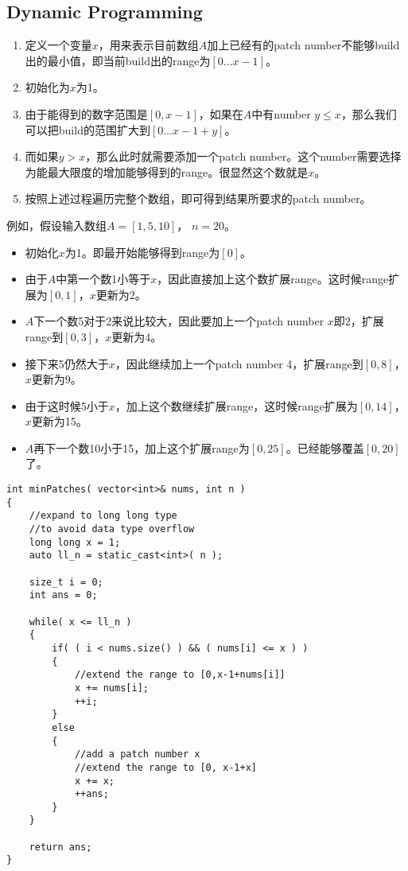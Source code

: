 \subsection{Dynamic Programming}
\begin{enumerate}
\item 定义一个变量$ x $，用来表示目前数组$A$加上已经有的patch number不能够build出的最小值，即当前build出的range为$[0\ldots x-1]$。
\item 初始化为$x$为1。
\item 由于能得到的数字范围是$[0, x-1]$，如果在$A$中有number $y\leq x$，那么我们可以把build的范围扩大到$[0\ldots x-1+y]$。
\item 而如果$y>x$，那么此时就需要添加一个patch number。这个number需要选择为能最大限度的增加能够得到的range。很显然这个数就是$x$。
\item 按照上述过程遍历完整个数组，即可得到结果所要求的patch number。
\end{enumerate}
例如，假设输入数组$A = [1, 5, 10] $， $ n=20 $。
\begin{itemize}
\item 初始化$x$为1。即最开始能够得到range为$[0]$。
\item 由于$A$中第一个数1小等于$x$，因此直接加上这个数扩展range。这时候range扩展为$[0, 1]$，$x$更新为2。
\item $A$下一个数5对于2来说比较大，因此要加上一个patch number $x$即2，扩展range到$[0, 3]$，$x$更新为4。
\item 接下来5仍然大于$x$，因此继续加上一个patch number 4，扩展range到$[0,8]$，$x$更新为9。
\item 由于这时候5小于$x$，加上这个数继续扩展range，这时候range扩展为$[0, 14]$，$x$更新为15。
\item  $A$再下一个数10小于15，加上这个扩展range为$[0, 25]$。已经能够覆盖$[0,20]$了。
\end{itemize}


\setcounter{lstlisting}{0}
\begin{lstlisting}[style=customc, caption={Dynamic Programming}]
int minPatches( vector<int>& nums, int n )
{
    //expand to long long type
    //to avoid data type overflow
    long long x = 1;
    auto ll_n = static_cast<int>( n );

    size_t i = 0;
    int ans = 0;

    while( x <= ll_n )
    {
        if( ( i < nums.size() ) && ( nums[i] <= x ) )
        {
            //extend the range to [0,x-1+nums[i]]
            x += nums[i];
            ++i;
        }
        else
        {
            //add a patch number x
            //extend the range to [0, x-1+x]
            x += x;
            ++ans;
        }
    }

    return ans;
}

\end{lstlisting}


